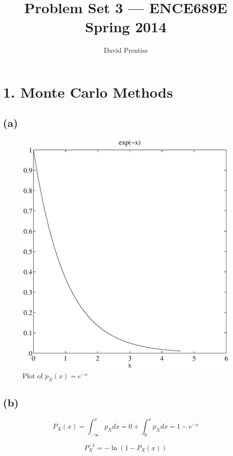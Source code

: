 \documentclass[fleqn, letterpaper]{tufte-handout}
\title{Problem Set 3 --- ENCE689E Spring 2014}
\author{David Prentiss}
\begin{document}
\maketitle

\section{1. Monte Carlo Methods}
\subsection{(a)}
\begin{figure}
        \includegraphics[width=\textwidth]{problem1a}
        \caption{Plot of $p_X(x)=e^{-x}$}
        \label{exprnd}
\end{figure}

\subsection{(b)}
\[
        P_X(x) = \int_{-\infty}^x p_X dx
        = 0 + \int_0^x p_X dx = 1 - e^{-x}
\]

\[
        P^{-1}_X = -\ln(1-P_X(x))
\]
\end{document}
